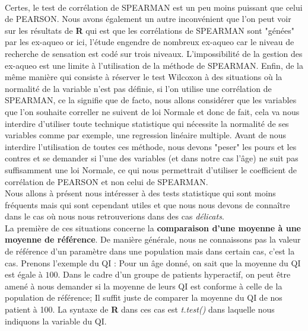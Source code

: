 \\
Certes, le test de corrélation de SPEARMAN est un peu moins puissant que celui de PEARSON. Nous avons également un autre inconvénient que l'on peut voir sur les résultats de \textbf{R} qui est que les corrélations de SPEARMAN sont "génées" par les ex-aqueo or ici, l'étude engendre de nombreux ex-aqueo car le niveau de recherche de sensation est codé sur trois niveaux. L'impossibilité de la gestion des ex-aqueo est une limite à l'utilisation de la méthode de SPEARMAN.\newline
Enfin, de la même manière qui consiste à réserver le test Wilcoxon à des situations où la normalité de la variable n'est pas définie, si l'on utilise une corrélation de SPEARMAN, ce la signifie que de facto, nous allons considérer que les variables que l'on souhaite correller ne suivent de loi Normale et donc de fait, cela va nous interdire d'utiliser toute technique statistique qui nécessite la normalité de ses variables comme par exemple, une regression linéaire multiple.\newline
Avant de nous interdire l'utilisation de toutes ces méthode, nous devons "peser" les pours et les contres et se demander si l'une des variables (et dans notre cas l'âge) ne suit pas suffisamment une loi Normale, ce qui nous permettrait d'utiliser le coefficient de corrélation de PEARSON et non celui de SPEARMAN.\newline
\\
Nous allons à présent nous intéresser à des tests statistique qui sont moins fréquents mais qui sont cependant utiles et que nous nous devons de connaître dans le cas où nous nous retrouverions dans des cas \textit{délicats}.\newline 
\\
La première de ces situations concerne la \textbf{comparaison d'une moyenne à une moyenne de référence}.\newline
De manière générale, nous ne connaissons pas la valeur de référence d'un paramètre dans une population mais dans certain cas, c'est la cas. Prenons l'exemple du QI : Pour un âge donné, on sait que la moyenne du QI est égale à $100$. Dans le cadre d'un groupe de patients hyperactif, on peut être amené à nous demander si la moyenne de leurs QI est conforme à celle de la population de référence; Il suffit juste de comparer la moyenne du QI de nos patient à 100.\newline
La syntaxe de \textbf{R} dans ces cas est \textit{t.test()} dans laquelle nous indiquons la variable du QI.\newline

